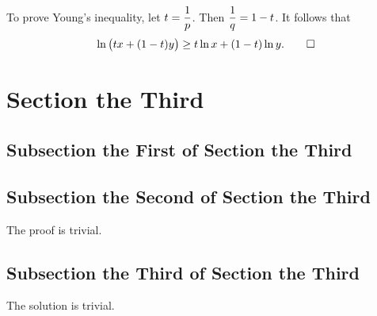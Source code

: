 To prove Young's inequality, let \(\displaystyle t = \frac{1}{p}\). Then \(\displaystyle \frac{1}{q} = 1 - t\). It follows that
\[
  \ln \big(t x + (1 - t) y \big) \ge t \ln x + (1 - t) \ln y. \qedhere
\]
\Epr

\section{Section the Third}

\Bxm[Noether]
\kant[6]
\Exm

\subsection{Subsection the First of Section the Third}

\Bxr[Euler]
\kant[7]
\Exr

\subsection{Subsection the Second of Section the Third}

\Bpr
The proof is trivial.
\Epr

\subsection{Subsection the Third of Section the Third}

\Bsl[Riemann]
The solution is trivial.
\Esl

\Edc
